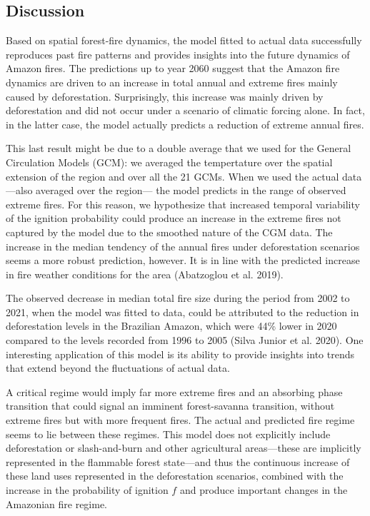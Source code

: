 \documentclass[
]{article}
\begin{document}
\subsection{Discussion}\label{discussion}

Based on spatial forest-fire dynamics, the model fitted to actual data
successfully reproduces past fire patterns and provides insights into
the future dynamics of Amazon fires. The predictions up to year 2060
suggest that the Amazon fire dynamics are driven to an increase in total
annual and extreme fires mainly caused by deforestation. Surprisingly,
this increase was mainly driven by deforestation and did not occur under
a scenario of climatic forcing alone. In fact, in the latter case, the
model actually predicts a reduction of extreme annual fires.

This last result might be due to a double average that we used for the
General Circulation Models (GCM): we averaged the tempertature over the
spatial extension of the region and over all the 21 GCMs. When we used
the actual data ---also averaged over the region--- the model predicts
in the range of observed extreme fires. For this reason, we hypothesize
that increased temporal variability of the ignition probability could
produce an increase in the extreme fires not captured by the model due
to the smoothed nature of the CGM data. The increase in the median
tendency of the annual fires under deforestation scenarios seems a more
robust prediction, however. It is in line with the predicted increase in
fire weather conditions for the area (Abatzoglou et al. 2019).

The observed decrease in median total fire size during the period from
2002 to 2021, when the model was fitted to data, could be attributed to
the reduction in deforestation levels in the Brazilian Amazon, which
were 44\% lower in 2020 compared to the levels recorded from 1996 to
2005 (Silva Junior et al. 2020). One interesting application of this
model is its ability to provide insights into trends that extend beyond
the fluctuations of actual data.

A critical regime would imply far more extreme fires and an absorbing
phase transition that could signal an imminent forest-savanna
transition, without extreme fires but with more frequent fires. The
actual and predicted fire regime seems to lie between these regimes.
This model does not explicitly include deforestation or slash-and-burn
and other agricultural areas---these are implicitly represented in the
flammable forest state---and thus the continuous increase of these land
uses represented in the deforestation scenarios, combined with the
increase in the probability of ignition \(f\) and produce important
changes in the Amazonian fire regime.
\end{document}
